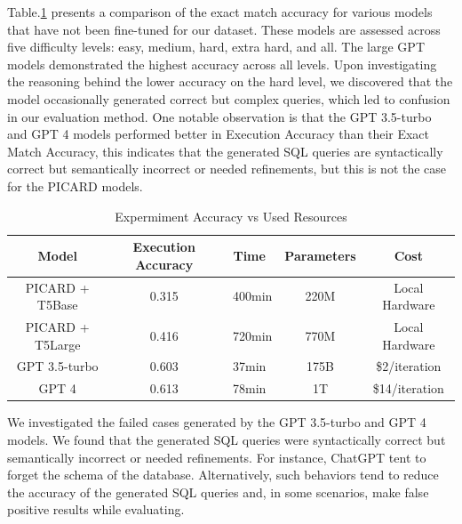 Table.\ref{tab:exp-acc-vs-resources} presents a comparison of the exact match accuracy for various models that have not been fine-tuned for our dataset. These models are assessed across five difficulty levels: easy, medium, hard, extra hard, and all. The large GPT models demonstrated the highest accuracy across all levels. Upon investigating the reasoning behind the lower accuracy on the hard level, we discovered that the model occasionally generated correct but complex queries, which led to confusion in our evaluation method. One notable observation is that the GPT 3.5-turbo and GPT 4 models performed better in Execution Accuracy than their Exact Match Accuracy, this indicates that the generated SQL queries are syntactically correct but semantically incorrect or needed refinements, but this is not the case for the PICARD models.

\begin{table}[!ht]
    \centering
    \begin{tabular}{ccccc}
        \hline
        Model            & \textbf{Execution Accuracy} & \textbf{Time} & \textbf{Parameters} & \textbf{Cost}  \\ \hline
        PICARD + T5Base  & 0.315                       & ~400min       & 220M                & Local Hardware \\ \hline
        PICARD + T5Large & 0.416                       & ~720min       & 770M                & Local Hardware \\ \hline
        GPT 3.5-turbo    & 0.603                       & 37min         & 175B                & \$2/iteration  \\ \hline
        GPT 4            & 0.613                       & 78min         & 1T                  & \$14/iteration \\ \hline
    \end{tabular}
    \caption{Expermiment Accuracy vs Used Resources}
    \label{tab:exp-acc-vs-resources}
\end{table}

We investigated the failed cases generated by the GPT 3.5-turbo and GPT 4 models. We found that the generated SQL queries were syntactically correct but semantically incorrect or needed refinements. For instance, ChatGPT tent to forget the schema of the database. Alternatively, such behaviors tend to reduce the accuracy of the generated SQL queries and, in some scenarios, make false positive results while evaluating.

